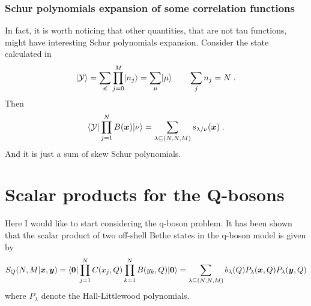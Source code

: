 \documentclass[a4paper,11pt]{amsart}
\begin{document}
\subsubsection{Schur polynomials expansion of some correlation functions}
In fact, it is worth noticing that other quantities, that are not tau
functions, might have interesting Schur polynomials expansion.
Consider the state calculated in~\cite{Bogoliubov2005}
\begin{equation}
  \lvert\mathcal{Y}\rangle =
 \sum_{\vec{n}} \prod_{j=0}^M \lvert n_j\rangle = \sum_\mu \lvert\mu\rangle \qquad \sum_j n_j = N\; .
\end{equation}
Then
\begin{equation}
 \langle\mathcal{Y}\rvert \prod_{j=1}^N B(\bm{x}) \lvert\nu\rangle = 
  \sum_{\lambda\subseteq (N,N,M)} s_{\lambda/\nu}(\bm{x})\; . 
\end{equation}
And it is just a sum of skew Schur polynomials.


\section{Scalar products for the Q-bosons}

Here I would like to start considering the q-boson problem. It has
been shown~\cite{Wheeler:2010vmq, Sulkowski:2008mx, Tsilevich:2006}
that the scalar product of two off-shell Bethe states in the q-boson
model is given by
\begin{equation}
S_Q(N,M | \bm{x}, \bm{y}) = \langle\bm{0}\rvert \prod_{j=1}^N C(x_j, Q)
\prod_{k=1}^N B(y_k, Q) \lvert\bm{0}\rangle
= \sum_{\lambda \subseteq
  (N,N,M)} b_\lambda(Q) P_{\lambda}(\bm{x}, Q) P_{\lambda}(\bm{y}, Q)
\end{equation}
where \(P_\lambda\) denote the Hall-Littlewood polynomials.
\end{document}
